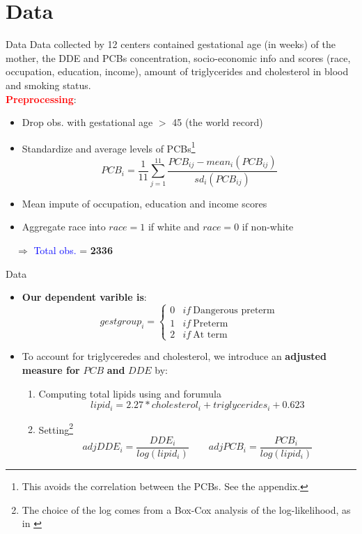 \documentclass{beamer}
\begin{document}
\section{Data}
\begin{frame}{Data}
Data collected by 12 centers contained gestational age (in weeks) of the mother, the DDE and PCBs concentration, socio-economic info and scores (race, occupation, education, income), amount of triglycerides and cholesterol in blood and smoking status. \\
\medskip 
\textcolor{red}{\textbf{Preprocessing}}:
\begin{itemize}
	\item Drop obs. with gestational age $>$ 45 (the world record)
	\item Standardize and average levels of PCBs\footnote{This avoids the correlation between the PCBs. See the appendix.}
	$$PCB_i = \frac{1}{11}\sum_{j=1}^{11} \frac{PCB_{ij} - mean_i(PCB_{ij})}{sd_i(PCB_{ij})}$$
	\item Mean impute of occupation, education and income scores 
	\item Aggregate race into $race = 1$ if white and $race=0$ if non-white
\end{itemize}
$\quad \Longrightarrow$ \textcolor{blue}{Total obs.} = \textbf{2336}
\end{frame}


\begin{frame}{Data}
\small
\begin{itemize}
	\item \textbf{Our dependent varible is}:
	$$gestgroup_i = 
	\begin{cases}
	0 & if \ \textrm{Dangerous preterm} \\
	1 & if \ \textrm{Preterm} \\
	2 & if \ \textrm{At term} 
	\end{cases}$$
	\item To account for triglyceredes and cholesterol, we introduce an \textbf{adjusted measure for} $PCB$ \textbf{and} $DDE$ by:
	\begin{enumerate}
		\item Computing total lipids using \cite{Phillips1989} and \cite{Bernert2007} forumula $$lipid_i =  2.27 * cholesterol_i + triglycerides_i + 0.623$$ 
		\item Setting\footnote{The choice of the log comes from a Box-Cox analysis of the log-likelihood, as in \cite{Li_Long_Duns}}
		$$adjDDE_i = \frac{DDE_i}{log(lipid_i)} \qquad adjPCB_i = \frac{PCB_i}{log(lipid_i)}$$
	\end{enumerate}
\end{itemize}
\end{frame}
\end{document}
